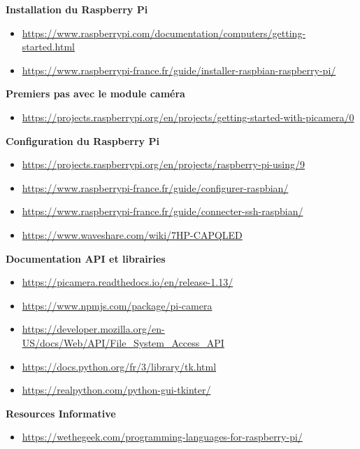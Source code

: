 \begin{thebibliography}{9}
    \textbf{Installation du Raspberry Pi}
    \begin{itemize}
        \item \footnotesize{\url{https://www.raspberrypi.com/documentation/computers/getting-started.html}}
        \item \footnotesize{\url{https://www.raspberrypi-france.fr/guide/installer-raspbian-raspberry-pi/}}
    \end{itemize}

    \textbf{Premiers pas avec le module caméra}
    \begin{itemize}
        \item \footnotesize{\url{https://projects.raspberrypi.org/en/projects/getting-started-with-picamera/0}}
    \end{itemize}

    \textbf{Configuration du Raspberry Pi}
    \begin{itemize}
        \item \footnotesize{\url{https://projects.raspberrypi.org/en/projects/raspberry-pi-using/9}}
        \item \footnotesize{\url{https://www.raspberrypi-france.fr/guide/configurer-raspbian/}}
        \item \footnotesize{\url{https://www.raspberrypi-france.fr/guide/connecter-ssh-raspbian/}}
        \item \footnotesize{\url{https://www.waveshare.com/wiki/7HP-CAPQLED}}
    \end{itemize}    

    \textbf{Documentation API et librairies}
    \begin{itemize}
        \item \footnotesize{\url{https://picamera.readthedocs.io/en/release-1.13/}}
        \item \footnotesize{\url{https://www.npmjs.com/package/pi-camera}}
        \item \footnotesize{\url{https://developer.mozilla.org/en-US/docs/Web/API/File_System_Access_API}}
        \item \footnotesize{\url{https://docs.python.org/fr/3/library/tk.html}}
        \item \footnotesize{\url{https://realpython.com/python-gui-tkinter/}}
    \end{itemize}

    \textbf{Resources Informative}
    \begin{itemize}
        \item \footnotesize{\url{https://wethegeek.com/programming-languages-for-raspberry-pi/}}
    \end{itemize}
    
\end{thebibliography}